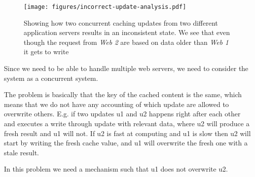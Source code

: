 \begin{figure*}[ht!]
  \centering
  \texttt{[image: figures/incorrect-update-analysis.pdf]}
  \caption{Showing how two concurrent caching updates from two different application servers results in an inconsistent state. We see that even though the request from \emph{Web 2} are based on data older than \emph{Web 1} it gets to write }
  \label{fig:incorrect-updates-analysis}
\end{figure*}





%
%
%



Since we need to be able to handle multiple web servers, we need to consider
the system as a concurrent system.

The problem is basically that the key of the cached content is the same, which
means that we do not have any accounting of which update are allowed to
overwrite others. E.g. if two updates u1 and u2 happens right after each other
and executes a write through update with relevant data, where u2 will produce
a fresh result and u1 will not. If u2 is fast at computing and u1 is slow then
u2 will start by writing the fresh cache value, and u1 will overwrite the
fresh one with a stale result.

In this problem we need a mechanism such that u1 does not overwrite u2.


